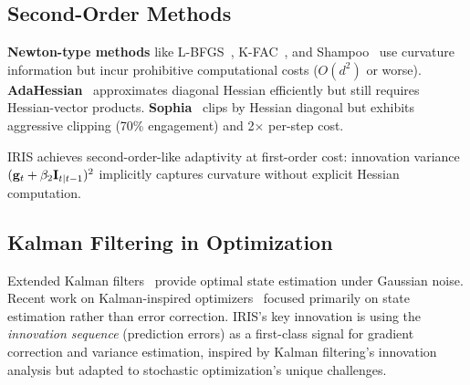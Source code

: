 \subsection{Second-Order Methods}

\textbf{Newton-type methods} like L-BFGS~\citep{liu1989lbfgs}, K-FAC~\citep{martens2015kfac}, and Shampoo~\citep{gupta2018shampoo} use curvature information but incur prohibitive computational costs ($O(d^2)$ or worse). \textbf{AdaHessian}~\citep{yao2021adahessian} approximates diagonal Hessian efficiently but still requires Hessian-vector products. \textbf{Sophia}~\citep{liu2023sophia} clips by Hessian diagonal but exhibits aggressive clipping (70\% engagement) and 2$\times$ per-step cost.

IRIS achieves second-order-like adaptivity at first-order cost: innovation variance $(\mathbf{g}_t + \beta_2 \mathbf{I}_{t|t-1})^2$ implicitly captures curvature without explicit Hessian computation.

\subsection{Kalman Filtering in Optimization}

Extended Kalman filters~\citep{kalman1960filter} provide optimal state estimation under Gaussian noise. Recent work on Kalman-inspired optimizers~\citep{vuckovic2018kalman,olivier2021kalman} focused primarily on state estimation rather than error correction. IRIS's key innovation is using the \emph{innovation sequence} (prediction errors) as a first-class signal for gradient correction and variance estimation, inspired by Kalman filtering's innovation analysis but adapted to stochastic optimization's unique challenges.
